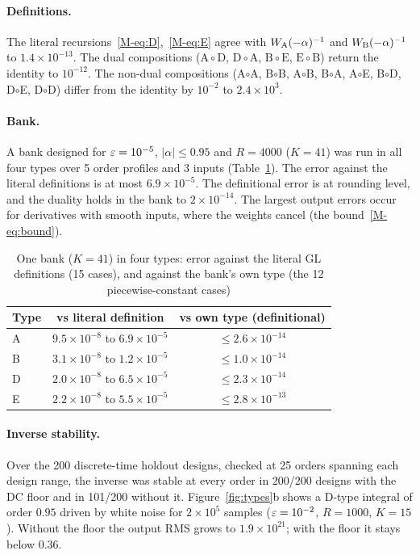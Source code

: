 \paragraph{Definitions.} The literal recursions~\eqref{M-eq:D},~\eqref{M-eq:E} agree with $W_{\mathrm A}(-\alpha)^{-1}$ and $W_{\mathrm B}(-\alpha)^{-1}$ to $1.4\times10^{-13}$. The dual compositions ($\mathrm A\circ\mathrm D$, $\mathrm D\circ\mathrm A$, $\mathrm B\circ\mathrm E$, $\mathrm E\circ\mathrm B$) return the identity to $10^{-12}$. The non-dual compositions (A$\circ$A, B$\circ$B, A$\circ$B, B$\circ$A, A$\circ$E, B$\circ$D, D$\circ$E, D$\circ$D) differ from the identity by $10^{-2}$ to $2.4\times10^{3}$.

\paragraph{Bank.} A bank designed for $\varepsilon=10^{-5}$, $|\alpha|\le0.95$ and $R=4000$ ($K=41$) was run in all four types over 5 order profiles and 3 inputs (Table~\ref{tab:e4}). The error against the literal definitions is at most $6.9\times10^{-5}$. The definitional error is at rounding level, and the duality holds in the bank to $2\times10^{-14}$. The largest output errors occur for derivatives with smooth inputs, where the weights cancel (the bound~\eqref{M-eq:bound}).

\begin{table}[t]
\caption{One bank ($K=41$) in four types: error against the literal GL definitions (15 cases), and against the bank's own type (the 12 piecewise-constant cases)}\label{tab:e4}
\begin{tabular}{@{}lcc@{}}
\toprule
Type & vs literal definition & vs own type (definitional)\\
\midrule
A & $9.5\times10^{-8}$ to $6.9\times10^{-5}$ & $\le2.6\times10^{-14}$\\
B & $3.1\times10^{-8}$ to $1.2\times10^{-5}$ & $\le1.0\times10^{-14}$\\
D & $2.0\times10^{-8}$ to $6.5\times10^{-5}$ & $\le2.3\times10^{-14}$\\
E & $2.2\times10^{-8}$ to $5.5\times10^{-5}$ & $\le2.8\times10^{-13}$\\
\bottomrule
\end{tabular}
\end{table}

\paragraph{Inverse stability.} Over the 200 discrete-time holdout designs, checked at 25 orders spanning each design range, the inverse was stable at every order in 200/200 designs with the DC floor and in 101/200 without it. Figure~\ref{fig:types}b shows a D-type integral of order $0.95$ driven by white noise for $2\times10^5$ samples ($\varepsilon=10^{-2}$, $R=1000$, $K=15$). Without the floor the output RMS grows to $1.9\times10^{21}$; with the floor it stays below $0.36$.

